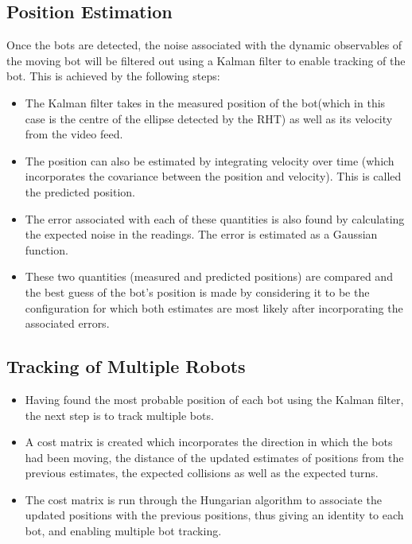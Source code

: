 \documentclass[12pt]{article}
\begin{document}
    \subsection{Position Estimation}
        Once the bots are detected, the noise associated with the dynamic observables of the moving bot will be filtered out using a Kalman filter to enable tracking of the bot.  This is achieved by the following steps:
        \begin{itemize}
            \item The Kalman filter takes in the measured position of the bot(which in this case is the centre of the ellipse detected by the RHT) as well as its velocity from the video feed.
            \item The position can also be estimated by integrating velocity over time (which incorporates the covariance between the position and velocity). This is called the predicted position.
            \item The error associated with each of these quantities is also found by calculating the expected noise in the readings. The error is estimated as a Gaussian function. 
            \item These two quantities (measured and predicted positions) are compared and the best guess of the bot’s position is made by considering it to be the configuration for which both estimates are most likely after incorporating the associated errors.
        \end{itemize}
    
    \subsection{Tracking of Multiple Robots}
        \begin{itemize}
            \item Having found the most probable position of each bot using the Kalman filter, the next step is to track multiple bots.
            \item A cost matrix is created which incorporates the direction in which the bots had been moving, the distance of the updated estimates of positions from the previous estimates, the expected collisions as well as the expected turns.
            \item The cost matrix is run through the Hungarian algorithm to associate the updated positions with the previous positions, thus giving an identity to each bot, and enabling multiple bot tracking.
        \end{itemize}
\end{document}
